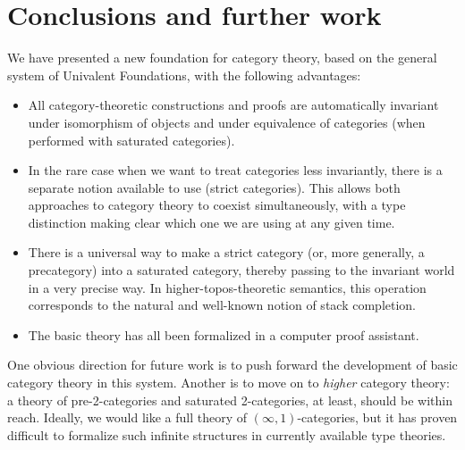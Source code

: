\documentclass{amsart}
\theoremstyle{definition}
\theoremstyle{remark}
\numberwithin{equation}{section}
\begin{document}
\section{Conclusions and further work}
\label{sec:conclusion}

We have presented a new foundation for category theory, based on the general system of Univalent Foundations, with the following advantages:
\begin{itemize}
\item All category-theoretic constructions and proofs are automatically invariant under isomorphism of objects and under equivalence of categories (when performed with saturated categories).
\item In the rare case when we want to treat categories less invariantly, there is a separate notion available to use (strict categories).
  This allows both approaches to category theory to coexist simultaneously, with a type distinction making clear which one we are using at any given time.
\item There is a universal way to make a strict category (or, more generally, a precategory) into a saturated category, thereby passing to the invariant world in a very precise way.
  In higher-topos-theoretic semantics, this operation corresponds to the natural and well-known notion of stack completion.
\item The basic theory has all been formalized in a computer proof assistant.
\end{itemize}
One obvious direction for future work is to push forward the development of basic category theory in this system.
Another is to move on to \emph{higher} category theory: a theory of pre-2-categories and saturated 2-categories, at least, should be within reach.
Ideally, we would like a full theory of $(\infty,1)$-categories, but it has proven difficult to formalize such infinite structures in currently available type theories.




\end{document}

